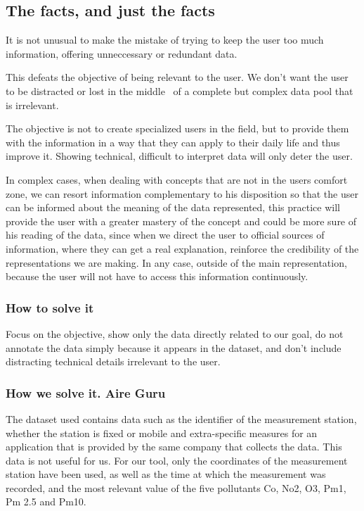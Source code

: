 \subsection{The facts, and just the facts}
It is not unusual to make the mistake of trying to keep the user too much information, offering unneccessary or redundant data.
 
This defeats the objective of being relevant to the user. We don't want the user to be distracted or lost in the middle
 of a complete but complex data pool that is irrelevant.

The objective is not to create specialized users in the field, but to provide them with the
information in a way that they can apply to their daily life and thus improve it. Showing
technical, difficult to interpret data will only deter the user. 

In complex cases, when dealing with concepts that are not in the users comfort zone, we can resort information
complementary to his disposition so that the user can be informed about the meaning of the data
represented, this practice will provide the user with a greater mastery of the concept and could be more
sure of his reading of the data, since when we direct the user to official sources of information, where they can
get a real explanation, reinforce the credibility of the representations we are making. In any case,
outside of the main representation, because the user will not have to access this information continuously.

\subsubsection*{How to solve it} 
Focus on the objective, show only the data directly related to our goal, do not annotate the data
simply because it appears in the dataset, and don't include distracting technical details irrelevant to the user.

\subsubsection*{How we solve it. Aire Guru} 

The dataset used contains data such as the identifier of the measurement station, whether the station is fixed or mobile
and extra-specific measures for an application that is provided by the same company that collects the data. This data is not useful for us.
For our tool, only the coordinates of the measurement station have been used, as well as the time at which the measurement was recorded, and the most relevant value of the five pollutants Co, No2, O3, Pm1, Pm 2.5 and Pm10.

